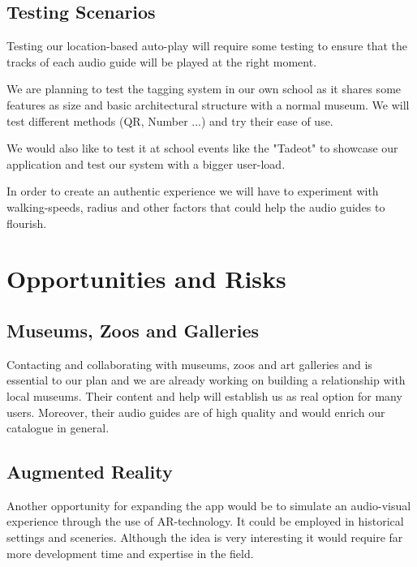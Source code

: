 \documentclass[12pt]{article}
\theoremstyle{definition}
\newenvironment{text}{
}{}
\begin{document}
\subsection{Testing Scenarios}
\begin{text} 
Testing our location-based auto-play will require some testing to ensure that the tracks of each audio guide will be played at the right moment.\newline

We are planning to test the tagging system in our own school as it shares some features as size and basic architectural structure with a normal museum. We will test different methods (QR, Number ...) and try their ease of use.\newline

We would also like to test it at school events like the "Tadeot" to showcase our application and test our system with a bigger user-load.\newline

In order to create an authentic experience we will have to experiment with walking-speeds, radius and other factors that could help the audio guides to flourish.\newline
\end{text}
 
\pagebreak
\section{Opportunities and Risks}

\subsection{Museums, Zoos and Galleries}
\begin{text}
Contacting and collaborating with museums, zoos and art galleries and  is essential to our plan and we are already working on building a relationship with local museums.  Their content and help will establish us as real option for many users.  Moreover, their audio guides are of high quality and would enrich our catalogue in general.
\end{text}

\subsection{Augmented Reality}
\begin{text}
Another opportunity for expanding the app would be to simulate an audio-visual experience through the use of AR-technology. It could be employed in historical settings and sceneries. Although the idea is very interesting it would require far more development time and expertise in the field.\newline
\end{text}
\end{document}
